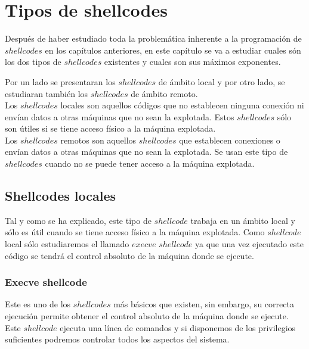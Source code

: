 \documentclass [titlepage, 12pt]{article}
\begin{document}
\section{Tipos de shellcodes}

Despu\'es de haber estudiado toda la problem\'atica inherente a la programaci\'on de $shellcodes$ en los cap\'itulos anteriores, en este cap\'itulo se va a estudiar cuales s\'on los dos tipos de $shellcodes$ existentes y cuales son sus m\'aximos exponentes.\bigskip

Por un lado se presentaran los $shellcodes$ de \'ambito local y por otro lado, se estudiaran tambi\'en los $shellcodes$ de \'ambito remoto.\\
Los $shellcodes$ locales son aquellos c\'odigos que no establecen ninguna conexi\'on ni env\'ian datos a otras m\'aquinas que no sean la explotada. Estos $shellcodes$ s\'olo son \'utiles si se tiene acceso f\'isico a la m\'aquina explotada.\\
Los $shellcodes$ remotos son aquellos $shellcodes$ que establecen conexiones o env\'ian datos a otras m\'aquinas que no sean la explotada. Se usan este tipo de $shellcodes$ cuando no se puede tener acceso a la m\'aquina explotada.\bigskip

\subsection{Shellcodes locales}

Tal y como se ha explicado, este tipo de $shellcode$ trabaja en un \'ambito local y s\'olo es \'util cuando se tiene acceso f\'isico a la m\'aquina explotada. Como $shellcode$ local s\'olo estudiaremos el llamado $execve$ $shellcode$ ya que una vez ejecutado este c\'odigo se tendr\'a el control absoluto de la m\'aquina donde se ejecute.\bigskip

\subsubsection{Execve shellcode}

Este es uno de los $shellcodes$ m\'as b\'asicos que existen, sin embargo, su correcta ejecuci\'on permite obtener el control absoluto de la m\'aquina donde se ejecute. Este $shellcode$ ejecuta una l\'inea de comandos y si disponemos de los privilegios suficientes podremos controlar todos los aspectos del sistema.\bigskip
\end{document}
